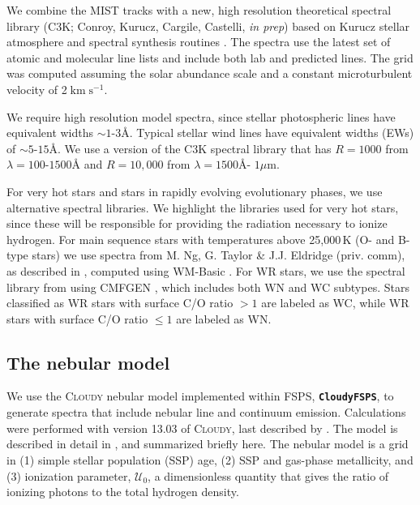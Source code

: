 \documentclass[preprint2,trackchanges]{aastex62}
\newcommand{\FSPS}{{\sc FSPS}\xspace}
\newcommand{\CloudyFSPS}{{\tt \textbf{CloudyFSPS}}\xspace}
\newcommand{\Cloudy}{\textsc{Cloudy}\xspace}
\newcommand{\ang}{\ensuremath{\mbox{\AA}}\xspace}
\newcommand{\U}{\ensuremath{\mathcal{U}_{0}}\xspace}
\newcommand{\kms}{\ensuremath{\;\mathrm{km}\;\mathrm{s}^{-1}}\xspace}
\begin{document}
We combine the MIST tracks with a new, high resolution theoretical spectral library (C3K; Conroy, Kurucz, Cargile, Castelli, \emph{in prep}) based on Kurucz stellar atmosphere and spectral synthesis routines \citep[ATLAS12 and SYNTHE,][]{Kurucz+2005}. The spectra use the latest set of atomic and molecular line lists and include both lab and predicted lines. The grid was computed assuming the \citet{Asplund+2009} solar abundance scale and a constant microturbulent velocity of 2\kms.

We require high resolution model spectra, since stellar photospheric lines have equivalent widths ${\sim}1$-$3$\ang. Typical stellar wind lines have equivalent widths (EWs) of ${\sim}5$-$15$\ang. We use a version of the C3K spectral library that has $R=1000$ from $\lambda=100$-$1500$\ang and $R=10,000$ from $\lambda=1500$\ang - $1\mu$m. 

For very hot stars and stars in rapidly evolving evolutionary phases, we use alternative spectral libraries. We highlight the libraries used for very hot stars, since these will be responsible for providing the radiation necessary to ionize hydrogen. For main sequence stars with temperatures above 25,000$\,$K (O- and B-type stars) we use spectra from M. Ng, G. Taylor \& J.J. Eldridge (priv. comm),  as described in \citet{Eldridge+2017}, computed using WM-Basic \citep{Pauldrach+2001}. For WR stars, we use the spectral library from \citet{Smith+2002} using CMFGEN \citep{Hillier+2001}, which includes both WN and WC subtypes. Stars classified as WR stars with surface C/O ratio ${>}1$ are labeled as WC, while WR stars with surface C/O ratio ${\leq}1$ are labeled as WN.

\subsection{The nebular model}\label{sec:model:neb}

We use the \Cloudy nebular model implemented within \FSPS, \CloudyFSPS \citep{cloudyFSPSv1}, to generate spectra that include nebular line and continuum emission. Calculations were performed with version 13.03 of \Cloudy, last described by \citet{Ferland+2013}. The model is described in detail in \citet{Byler+2017}, and summarized briefly here. The nebular model is a grid in (1) simple stellar population (SSP) age, (2) SSP and gas-phase metallicity, and (3) ionization parameter, \U, a dimensionless quantity that gives the ratio of ionizing photons to the total hydrogen density.
\end{document}
